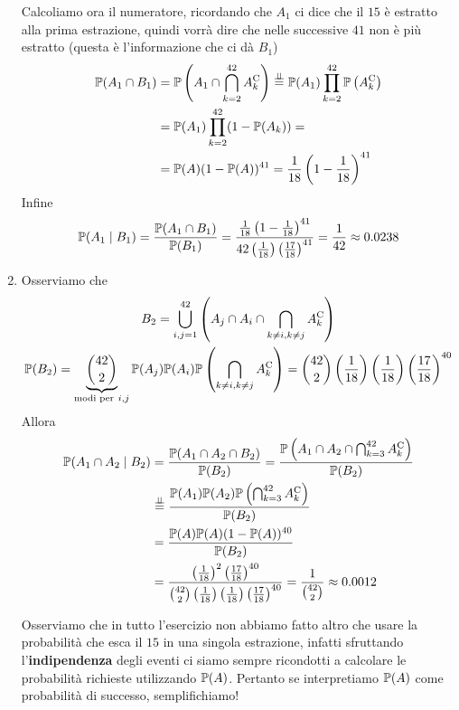 \begin{enumerate}
	Calcoliamo ora il numeratore, ricordando che $A_{1}$ ci dice che il $15$ è estratto alla prima estrazione, quindi vorrà dire che nelle successive $41$ non è più estratto (questa è l'informazione che ci dà $B_{1}$)
	\begin{align*}
		\mathbb{P}(A_{1} \cap B_{1}) & =\mathbb{P}\left(A_{1} \cap \bigcap_{k=2}^{42} A_{k}^{\mathrm{C}}\right)\overset{\perp \!\!\! \perp }{=}\mathbb{P}(A_{1})\prod_{k=2}^{42}\mathbb{P}\left(A_{k}^{\mathrm{C}}\right)\\
		 & =\mathbb{P}(A_{1})\prod_{k=2}^{42}(1-\mathbb{P}(A_{k})) =\\
		 & =\mathbb{P}(A)(1-\mathbb{P}(A))^{41} =\frac{1}{18}\left(1-\frac{1}{18}\right)^{41}
	\end{align*}
	Infine
	\begin{equation*}
		\mathbb{P}(A_{1} \mid B_{1}) =\frac{\mathbb{P}(A_{1} \cap B_{1})}{\mathbb{P}(B_{1})} =\frac{\frac{1}{18}\left(1-\frac{1}{18}\right)^{41}}{42\left(\frac{1}{18}\right)\left(\frac{17}{18}\right)^{41}} =\frac{1}{42} \approx 0.0238
	\end{equation*}
	\item Osserviamo che
	\begin{gather*}
		B_{2} =\bigcup_{i,j=1}^{42}\left(A_{j} \cap A_{i} \cap \bigcap_{k\neq i,k\neq j} A_{k}\comp\right)\\
		\PP(B_{2}) =\underbrace{\binom{42}{2}}_{\text{modi per} \ i,j}\PP(A_{j})\PP(A_{i})\PP\left(\bigcap_{k\neq i,k\neq j} A_{k}\comp\right) =\binom{42}{2}\left(\frac{1}{18}\right)\left(\frac{1}{18}\right)\left(\frac{17}{18}\right)^{40}
	\end{gather*}
	Allora
	\begin{align*}
		\mathbb{P}(A_{1} \cap A_{2} \mid B_{2}) & =\frac{\mathbb{P}(A_{1} \cap A_{2} \cap B_{2})}{\mathbb{P}(B_{2})} =\frac{\mathbb{P}\left(A_{1} \cap A_{2} \cap \bigcap_{k=3}^{42} A_{k}^{\mathrm{C}}\right)}{\mathbb{P}(B_{2})}\\
		 & \overset{\perp \!\!\! \perp }{=}\frac{\mathbb{P}(A_{1})\mathbb{P}(A_{2})\mathbb{P}\left(\bigcap_{k=3}^{42} A_{k}^{\mathrm{C}}\right)}{\mathbb{P}(B_{2})}\\
		 & =\frac{\mathbb{P}(A)\mathbb{P}(A)(1-\mathbb{P}(A))^{40}}{\mathbb{P}(B_{2})}\\
		 & =\frac{\left(\frac{1}{18}\right)^{2}\left(\frac{17}{18}\right)^{40}}{\binom{42}{2}\left(\frac{1}{18}\right)\left(\frac{1}{18}\right)\left(\frac{17}{18}\right)^{40}} =\frac{1}{\binom{42}{2}} \approx 0.0012
	\end{align*}

	\begin{oss}
		Osserviamo che in tutto l'esercizio non abbiamo fatto altro che usare la probabilità che esca il $15$ in una singola estrazione, infatti sfruttando l'\textbf{indipendenza} degli eventi ci siamo sempre ricondotti a calcolare le probabilità richieste utilizzando $\mathbb{P}(A)$. Pertanto se interpretiamo $\mathbb{P}(A)$ come probabilità di successo, semplifichiamo!
	\end{oss}
\end{enumerate}

